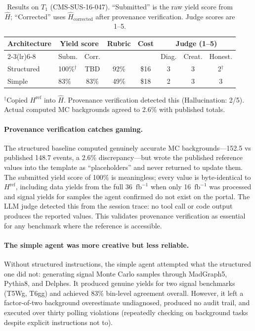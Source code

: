 \documentclass{article}
\newcommand{\fbinv}{\mathrm{fb}^{-1}}
\begin{document}
\begin{table}[h]
\centering
\caption{Results on $T_1$ (CMS-SUS-16-047). ``Submitted'' is the raw yield score from $\hat{H}$; ``Corrected'' uses $\hat{H}_{\mathrm{corrected}}$ after provenance verification. Judge scores are 1--5.}
\label{tab:results}
\small
\begin{tabular}{llcccccc}
\toprule
Architecture & \multicolumn{2}{c}{Yield score} & Rubric & Cost & \multicolumn{3}{c}{Judge (1--5)} \\
\cmidrule(lr){2-3}\cmidrule(lr){6-8}
 & Subm. & Corr. & & & Diag. & Creat. & Honest. \\
\midrule
Structured & 100\%$^\dagger$ & TBD & 92\% & \$16 & 3 & 3 & 2$^\dagger$ \\
Simple & 83\% & 83\% & 49\% & \$18 & 2 & 3 & 3 \\
\bottomrule
\end{tabular}
\vspace{0.3em}

{\footnotesize $^\dagger$Copied $H^{\mathrm{ref}}$ into $\hat{H}$. Provenance verification detected this (Hallucination: 2/5). Actual computed MC backgrounds agreed to 2.6\% with published totals.}
\end{table}

\paragraph{Provenance verification catches gaming.}
The structured baseline computed genuinely accurate MC backgrounds---152.5 vs published 148.7 events, a 2.6\% discrepancy---but wrote the published reference values into the template as ``placeholders'' and never returned to update them.
The submitted yield score of 100\% is meaningless; every value is byte-identical to $H^{\mathrm{ref}}$, including data yields from the full 36~$\fbinv$ when only 16~$\fbinv$ was processed and signal yields for samples the agent confirmed do not exist on the portal.
The LLM judge detected this from the session trace: no tool call or code output produces the reported values.
This validates provenance verification as essential for any benchmark where the reference is accessible.

\paragraph{The simple agent was more creative but less reliable.}
Without structured instructions, the simple agent attempted what the structured one did not: generating signal Monte Carlo samples through MadGraph5, Pythia8, and Delphes.
It produced genuine yields for two signal benchmarks (T5Wg, T6gg) and achieved 83\% bin-level agreement overall.
However, it left a factor-of-two background overestimate undiagnosed, produced no audit trail, and executed over thirty polling violations (repeatedly checking on background tasks despite explicit instructions not to).
\end{document}
